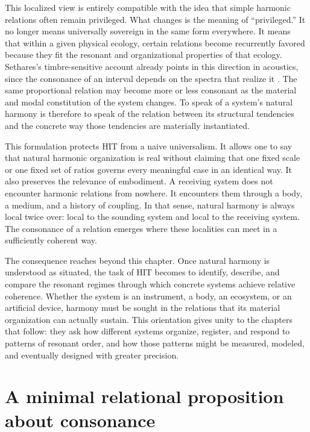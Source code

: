 This localized view is entirely compatible with the idea that simple harmonic relations often remain privileged. What changes is the meaning of \enquote{privileged.} It no longer means universally sovereign in the same form everywhere. It means that within a given physical ecology, certain relations become recurrently favored because they fit the resonant and organizational properties of that ecology. Sethares's timbre-sensitive account already points in this direction in acoustics, since the consonance of an interval depends on the spectra that realize it \parencite{sethares_2005}. The same proportional relation may become more or less consonant as the material and modal constitution of the system changes. To speak of a system's natural harmony is therefore to speak of the relation between its structural tendencies and the concrete way those tendencies are materially instantiated.

This formulation protects HIT from a naive universalism. It allows one to say that natural harmonic organization is real without claiming that one fixed scale or one fixed set of ratios governs every meaningful case in an identical way. It also preserves the relevance of embodiment. A receiving system does not encounter harmonic relations from nowhere. It encounters them through a body, a medium, and a history of coupling. In that sense, natural harmony is always local twice over: local to the sounding system and local to the receiving system. The consonance of a relation emerges where these localities can meet in a sufficiently coherent way.

The consequence reaches beyond this chapter. Once natural harmony is understood as situated, the task of HIT becomes to identify, describe, and compare the resonant regimes through which concrete systems achieve relative coherence. Whether the system is an instrument, a body, an ecosystem, or an artificial device, harmony must be sought in the relations that its material organization can actually sustain. This orientation gives unity to the chapters that follow: they ask how different systems organize, register, and respond to patterns of resonant order, and how those patterns might be measured, modeled, and eventually designed with greater precision.


\section{A minimal relational proposition about consonance}


